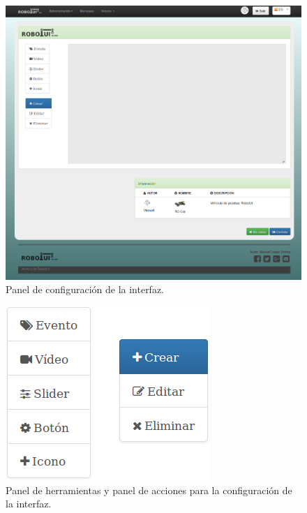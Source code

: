 \begin{figure}[H]
  \begin{center}
    \includegraphics[scale=0.4]{imagenes/manual-usuario/pagina-configurar-interfaz.png}
  \end{center}
  \caption{Panel de configuración de la interfaz.}
  \label{website:configuracion-interfaz}
\end{figure}



\begin{figure}[H]
  \begin{center}
    \includegraphics[scale=.6]{imagenes/manual-usuario/barra-herramientas-interfaz.png}
  \end{center}
  \caption{Panel de herramientas  y panel de acciones para la configuración de la interfaz.}
  \label{website:pagina-principal}
\end{figure}


